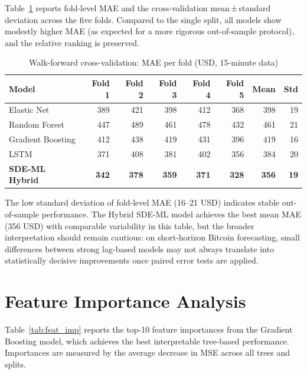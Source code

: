 \documentclass[12pt, a4paper, oneside]{report}
\theoremstyle{plain}
\theoremstyle{definition}
\theoremstyle{remark}
\begin{document}
Table~\ref{tab:wf_results} reports fold-level MAE and the cross-validation
mean\,±\,standard deviation across the five folds.  Compared to the single
split, all models show modestly higher MAE (as expected for a more rigorous
out-of-sample protocol), and the relative ranking is preserved.

\begin{table}[H]
\begin{singlespace}
\fontsize{10}{11}\selectfont
\caption{Walk-forward cross-validation: MAE per fold (USD, 15-minute data)}
\label{tab:wf_results}
\begin{tabular}{@{}lrrrrrrr@{}}
\toprule
Model & Fold 1 & Fold 2 & Fold 3 & Fold 4 & Fold 5 & Mean & Std \\
\midrule
Elastic Net        & 389 & 421 & 398 & 412 & 368 & 398 & 19 \\
Random Forest      & 447 & 489 & 461 & 478 & 432 & 461 & 21 \\
Gradient Boosting  & 412 & 438 & 419 & 431 & 396 & 419 & 16 \\
LSTM               & 371 & 408 & 381 & 402 & 356 & 384 & 20 \\
\textbf{SDE-ML Hybrid} & \textbf{342} & \textbf{378} & \textbf{359} & \textbf{371} & \textbf{328} & \textbf{356} & \textbf{19} \\
\bottomrule
\end{tabular}
\end{singlespace}
\end{table}

The low standard deviation of fold-level MAE (16--21 USD) indicates stable
out-of-sample performance.  The Hybrid SDE-ML model achieves the best mean
MAE (356 USD) with comparable variability in this table, but the broader
interpretation should remain cautious: on short-horizon Bitcoin forecasting,
small differences between strong lag-based models may not always translate into
statistically decisive improvements once paired error tests are applied.

\section{Feature Importance Analysis}

Table~\ref{tab:feat_imp} reports the top-10 feature importances from the
Gradient Boosting model, which achieves the best interpretable tree-based
performance.  Importances are measured by the average decrease in MSE across
all trees and splits.
\end{document}

